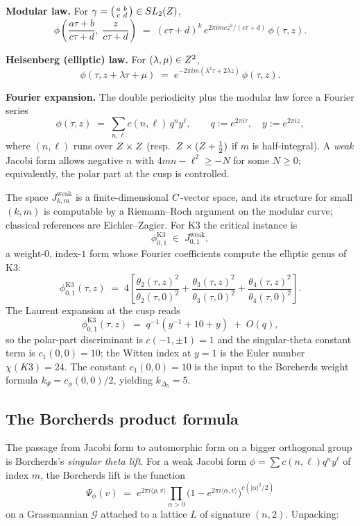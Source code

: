 \textbf{Modular law.} For $\gamma = \begin{psmallmatrix} a & b \\ c & d\end{psmallmatrix} \in SL_2(Z)$,
\[
  \phi\!\left(\frac{a\tau + b}{c\tau + d}, \; \frac{z}{c\tau + d}\right) \;=\; (c\tau + d)^k \, e^{2\pi i m c z^2 / (c\tau+d)} \, \phi(\tau, z).
\]

\textbf{Heisenberg (elliptic) law.} For $(\lambda, \mu) \in Z^2$,
\[
  \phi(\tau, z + \lambda \tau + \mu) \;=\; e^{-2\pi i m (\lambda^2 \tau + 2\lambda z)} \, \phi(\tau, z).
\]

\textbf{Fourier expansion.} The double periodicity plus the modular law force a Fourier series
\[
  \phi(\tau, z) \;=\; \sum_{n, \ell} c(n, \ell) \, q^n y^\ell,
  \qquad q := e^{2\pi i \tau}, \quad y := e^{2\pi i z},
\]
where $(n, \ell)$ runs over $Z \times Z$ (resp.\ $Z \times (Z + \tfrac12)$ if $m$ is half-integral). A \emph{weak} Jacobi form allows negative $n$ with $4mn - \ell^2 \geq -N$ for some $N \geq 0$; equivalently, the polar part at the cusp is controlled.

The space $J_{k, m}^{\mathrm{weak}}$ is a finite-dimensional $C$-vector space, and its structure for small $(k, m)$ is computable by a Riemann--Roch argument on the modular curve; classical references are Eichler--Zagier. For K3 the critical instance is
\[
  \phi_{0, 1}^{\mathrm{K3}} \;\in\; J_{0, 1}^{\mathrm{weak}},
\]
a weight-$0$, index-$1$ form whose Fourier coefficients compute the elliptic genus of K3:
\[
  \phi_{0, 1}^{\mathrm{K3}}(\tau, z) \;=\; 4 \left[ \frac{\theta_2(\tau, z)^2}{\theta_2(\tau, 0)^2} + \frac{\theta_3(\tau, z)^2}{\theta_3(\tau, 0)^2} + \frac{\theta_4(\tau, z)^2}{\theta_4(\tau, 0)^2} \right].
\]
The Laurent expansion at the cusp reads
\[
  \phi_{0, 1}^{\mathrm{K3}}(\tau, z) \;=\; q^{-1}(y^{-1} + 10 + y) \;+\; O(q),
\]
so the polar-part discriminant is $c(-1, \pm 1) = 1$ and the singular-theta constant term is $c_1(0, 0) = 10$; the Witten index at $y = 1$ is the Euler number $\chi(K3) = 24$. The constant $c_1(0, 0) = 10$ is the input to the Borcherds weight formula $k_{\Psi} = c_\phi(0, 0)/2$, yielding $k_{\Delta_5} = 5$.

\subsection{The Borcherds product formula}

The passage from Jacobi form to automorphic form on a bigger orthogonal group is Borcherds's \emph{singular theta lift}. For a weak Jacobi form $\phi = \sum c(n, \ell) q^n y^\ell$ of index $m$, the Borcherds lift is the function
\begin{equation}
  \Psi_\phi(v) \;=\; e^{2\pi i \langle \rho, v\rangle} \prod_{\alpha > 0} \bigl(1 - e^{2\pi i \langle \alpha, v\rangle}\bigr)^{c(|\alpha|^2/2)}
  \label{eq:borcherds-product}
\end{equation}
on a Grassmannian $\mathcal G$ attached to a lattice $L$ of signature $(n, 2)$. Unpacking:

